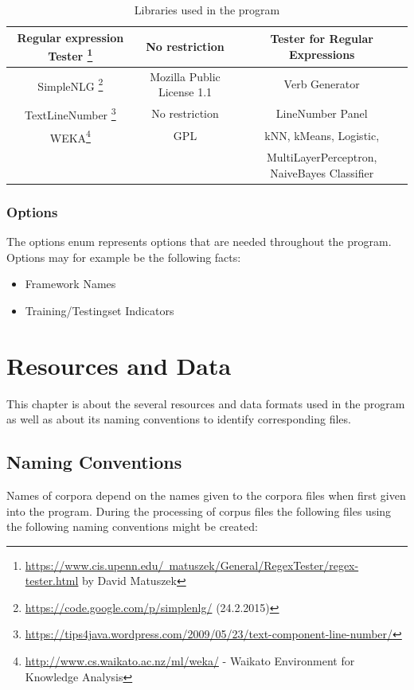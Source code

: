 \documentclass[10pt,a4paper,titlepage]{report}
\begin{document}
\begin{table}[htb]
\begin{tabular}{|c|c|c|}
			\hline
			Regular expression Tester \footnote{\href{https://www.cis.upenn.edu/~matuszek/General/RegexTester/regex-tester.html}{https://www.cis.upenn.edu/~matuszek/General/RegexTester/regex-tester.html}  by David Matuszek} & No restriction & Tester for Regular Expressions\\
			\hline
			SimpleNLG \footnote{\href{https://code.google.com/p/simplenlg/}{https://code.google.com/p/simplenlg/} (24.2.2015)} & Mozilla Public License 1.1 & Verb Generator\\
			\hline
			TextLineNumber \footnote{\href{https://tips4java.wordpress.com/2009/05/23/text-component-line-number/}{https://tips4java.wordpress.com/2009/05/23/text-component-line-number/}} & No restriction & LineNumber Panel\\
			\hline
			WEKA\footnote{\href{http://www.cs.waikato.ac.nz/ml/weka/}{http://www.cs.waikato.ac.nz/ml/weka/} - Waikato Environment for Knowledge Analysis} & GPL & kNN, kMeans, Logistic,\\
			& & MultiLayerPerceptron, NaiveBayes Classifier\\
			\hline
		\end{tabular}
		\caption{Libraries used in the program}
		\label{tab:libraries}
	\end{table}
	\subsection{Options}
	\label{sec:options}
	The options enum represents options that are needed throughout the program. Options may for example be the following facts: 
	\begin{itemize}
		\item Framework Names
		\item Training/Testingset Indicators
	\end{itemize}
	\chapter{Resources and Data}
	\label{sec:resourceData}
	This chapter is about the several resources and data formats used in the program as well as about its naming conventions to identify corresponding files.
	\section{Naming Conventions}
	\label{sec:namingconvs}
	Names of corpora depend on the names given to the corpora files when first given into the program. During the processing of corpus files the following files using the following naming conventions might be created:
\end{document}
